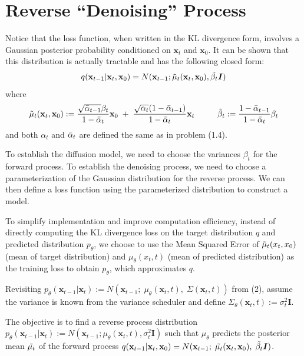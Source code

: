 \documentclass{article}
\begin{document}
\section{Reverse ``Denoising'' Process}
Notice that the loss function, when written in the KL divergence form, involves a Gaussian posterior probability conditioned on $\textbf{x}_t$ and $\textbf{x}_0$. It can be shown that this distribution is actually tractable and has the following closed form:
\begin{equation}
    q(\textbf{x}_{t-1}|\textbf{x}_t, \textbf{x}_0) = N(\textbf{x}_{t-1}; {\Tilde\mu_t}(\textbf{x}_t, \textbf{x}_0), \Tilde{\beta_t}\boldsymbol{I})
\end{equation}
where
\begin{equation}
    \Tilde{\mu}_t(\textbf{x}_t, \textbf{x}_0) := \frac{\sqrt{\Bar{\alpha}_{t-1}}\beta_t}{1 - \Bar{\alpha}_{t}}\textbf{x}_0 \; + \; \frac{\sqrt{\alpha_t}(1 - \Bar{\alpha}_{t-1})}{1 - \Bar{\alpha}_{t}}\textbf{x}_t \;\;\;\;\;\;\;\;\;\; \Tilde{\beta}_t := \frac{1 - \Bar{\alpha}_{t-1}}{1 - \Bar{\alpha}_{t}}\beta_t
\end{equation}
and both $\alpha_t$ and $\Bar{\alpha}_{t}$ are defined the same as in problem (1.4).

To establish the diffusion model, we need to choose the variances $\beta_t$ for the forward process. To establish the denoising process, we need to choose a parameterization of the Gaussian distribution for the reverse process. We can then define a loss function using the parameterized distribution to construct a model. 

To simplify implementation and improve computation efficiency, instead of directly computing the KL divergence loss on the target distribution $q$ and predicted distribution $p_\theta$, we choose to use the Mean Squared Error of $\Tilde{\mu}_t(x_t, x_0)$ (mean of target distribution) and $\mu_\theta(x_t, t)$ (mean of predicted distribution) as the training loss to obtain $p_\theta$, which approximates $q$. 

Revisiting $p_{\theta}(\textbf{x}_{t-1}|\textbf{x}_{t}) :=  N(\textbf{x}_{t-1};\;{\mu}_{\theta}(\textbf{x}_t, t),\;{\Sigma}(\textbf{x}_t, t))$ from (2), assume the variance is known from the variance scheduler and define ${\Sigma_\theta}(\textbf{x}_t, t) := {\sigma}_{t}^2\boldsymbol{I}$. 

The objective is to find a reverse process distribution $p_{\theta}(\textbf{x}_{t-1}|\textbf{x}_{t}) := N(\textbf{x}_{t-1}; {\mu}_{\theta}(\textbf{x}_t, t),  {\sigma}_{t}^2\boldsymbol{I})$ such that ${\mu}_{\theta}$ predicts the posterior mean $\Tilde{\mu_t}$ of the forward process $q(\textbf{x}_{t-1}|\textbf{x}_t, \textbf{x}_0) = N(\textbf{x}_{t-1};\;\Tilde{\mu_t}(\textbf{x}_t, \textbf{x}_0),\; \Tilde{\beta_t}\boldsymbol{I})$. 
\end{document}

